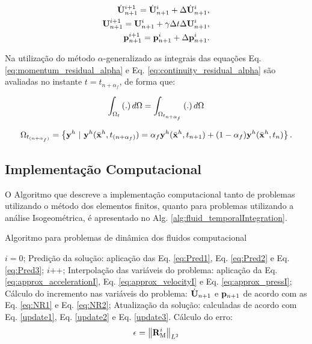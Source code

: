 \documentclass[tese_patricia]{subfiles}%
\begin{document}
\begin{align}
\dot{\mathbf{U}}_{n+1}^{i+1} = \dot{\mathbf{U}}_{n+1}^{i} + \Delta\dot{\mathbf{U}}_{n+1}^{i},\label{update1} \\ 
\mathbf{U}_{n+1}^{i+1} = \mathbf{U}_{n+1}^{i} + \gamma \Delta t \Delta\mathbf{U}_{n+1}^{i},\label{update2}\\
\mathbf{p}_{n+1}^{i+1} = \mathbf{p}_{n+1}^{i} + \Delta\mathbf{p}_{n+1}^{i}.\label{update3}
\end{align}

Na utilização do método $\alpha$-generalizado as integrais das equações Eq. \eqref{eq:momentum_residual_alpha} e Eq. \eqref{eq:continuity_residual_alpha} são avaliadas no instante $t = t_{n+\alpha_{f}}$, de forma que:

\begin{align}
\int_{\Omega_{t}} \left(.\right) d\Omega = \int_{\Omega_{t_{n+\alpha_{f}}}} \left(.\right) d\Omega
\end{align}

\begin{align}
\Omega_{t_{(n+\alpha_f)}} = \left\{\mathbf{y}^h \  |\  \mathbf{y}^h(\bar{\mathbf{x}}^h,t_{(n+\alpha_f)}) = \alpha_f \mathbf{y}^h(\bar{\mathbf{x}}^h,t_{n+1}) + (1-\alpha_f) \mathbf{y}^h(\bar{\mathbf{x}}^h,t_n)  \right\}.
\end{align}





\subsection{Implementação Computacional} \label{subsection:DFCComputationalCode}


O Algoritmo que descreve a implementação computacional tanto de problemas utilizando o método dos elementos finitos, quanto para problemas utilizando a análise Isogeométrica, é apresentado no Alg. \ref{alg:fluid_temporalIntegration}.

\begin{algorithm}
	\caption{Algoritmo para problemas de dinâmica dos fluidos computacional}
	\label{alg:fluid_temporalIntegration}
	\begin{algorithmic}[1]
		\State $i=0$;
		\State Predição da solução: aplicação das Eq. \eqref{eq:Pred1}, Eq. \eqref{eq:Pred2} e Eq. \eqref{eq:Pred3};
		\State $i$++;
		\State Interpolação das variáveis do problema: aplicação da Eq. \eqref{eq:approx_accelerationI}, Eq. \eqref {eq:approx_velocityI} e Eq. \eqref{eq:approx_pressI};
		\State Cálculo do incremento nas variáveis do problema: $\dot{\mathbf{U}}_{n+1}$ e $\mathbf{p}_{n+1}$ de acordo com as Eq. \eqref{eq:NR1} e Eq. \eqref{eq:NR2};
		\State Atualização da solução: calculadas de acordo com Eq. \eqref{update1}, Eq. \eqref{update2} e Eq. \eqref{update3}.
		\State Cálculo do erro:
		\begin{align}
		\epsilon =\left\| \mathbf{R}_\mathrm{M}^i \right\|_{L^2}
		\end{align}
		\EndWhile
		\EndFor
	\end{algorithmic}
\end{algorithm}
\end{document}
